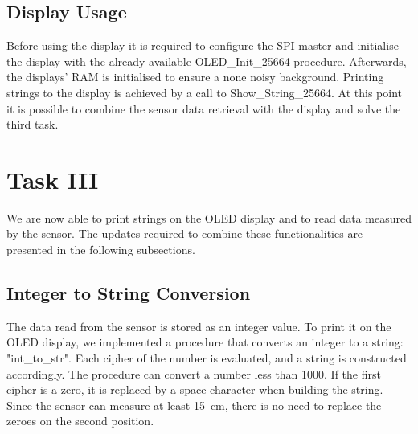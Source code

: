 		\subsection{Display Usage} %
		\label{sub:display_usage}
			Before using the display it is required to configure the SPI master and initialise the display with the already available OLED\_Init\_25664 procedure. Afterwards, the displays' RAM is initialised to ensure a none noisy background.
			Printing strings to the display is achieved by a call to Show\_String\_25664. At this point it is possible to combine the sensor data retrieval with the display and solve the third task.

	\section{Task III} %
	\label{sec:impl_task_3}
		We are now able to print strings on the OLED display and to read data measured by the sensor. The updates required to combine these functionalities are presented in the following subsections.
		
		\subsection{Integer to String Conversion} %
		\label{sub:integer_to_string_conversion}
			The data read from the sensor is stored as an integer value. To print it on the OLED display, we implemented a procedure that converts an integer to a string: "int\_to\_str". Each cipher of the number is evaluated, and a string is constructed accordingly. The procedure can convert a number less than 1000. If the first cipher is a zero, it is replaced by a space character when building the string. Since the sensor can measure at least \SI{15}{\centi\meter}, there is no need to replace the zeroes on the second position.  

